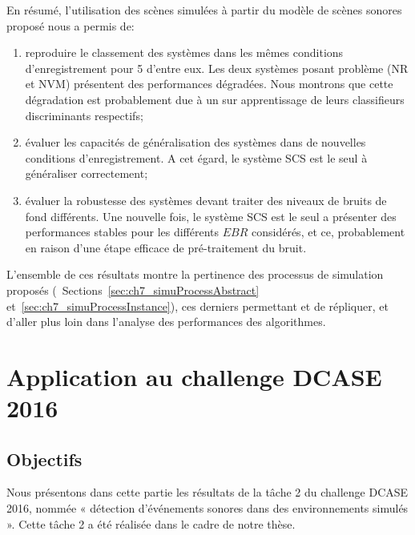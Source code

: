 En résumé, l'utilisation des scènes simulées à partir du modèle de scènes sonores proposé nous a permis de:

\begin{enumerate}
\item reproduire le classement des systèmes dans les mêmes conditions d'enregistrement pour 5 d'entre eux. Les deux systèmes posant problème (NR et NVM) présentent des performances dégradées. Nous montrons que cette dégradation est probablement due à un sur apprentissage de leurs classifieurs discriminants respectifs;
\item évaluer les capacités de généralisation des systèmes dans de nouvelles conditions d'enregistrement. A cet égard, le système SCS est le seul à généraliser correctement;
\item évaluer la robustesse des systèmes devant traiter des niveaux de bruits de fond différents. Une nouvelle fois, le système SCS est le seul a présenter des performances stables pour les différents $EBR$ considérés, et ce, probablement en raison d'une étape efficace de pré-traitement du bruit.
\end{enumerate}

L'ensemble de ces résultats montre la pertinence des processus de simulation proposés (\cf~Sections~\ref{sec:ch7_simuProcessAbstract} et~\ref{sec:ch7_simuProcessInstance}), ces derniers permettant et de répliquer, et d'aller plus loin dans l'analyse des performances des algorithmes.


\section{Application au challenge DCASE  2016}
\label{sec:ch5_appDcase2016}

\subsection{Objectifs}

Nous présentons dans cette partie les résultats de la tâche 2 du challenge DCASE 2016, nommée « détection d'événements sonores dans des environnements simulés ». Cette tâche 2 a été réalisée dans le cadre de notre thèse. 

